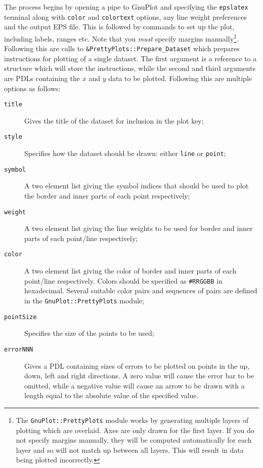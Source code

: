 The process begins by opening a pipe to {\sc GnuPlot} and specifying the {\tt epslatex} terminal along with {\tt color} and {\tt colortext} options, any line weight preferences and the output EPS file. This is followed by commands to set up the plot, including labels, ranges etc. Note that you \emph{must} specify margins manually\footnote{The {\tt GnuPlot::PrettyPlots} module works by generating multiple layers of plotting which are overlaid. Axes are only drawn for the first layer. If you do not specify margins manually, they will be computed automatically for each layer and so will not match up between all layers. This will result in data being plotted incorrectly.}. Following this are calls to {\tt \&PrettyPlots::Prepare\_Dataset} which prepares instructions for plotting of a single dataset. The first argument is a reference to a structure which will store the instructions, while the second and third arguments are PDLs containing the $x$ and $y$ data to be plotted. Following this are multiple options as follows:
\begin{description}
\item[{\tt title}] Gives the title of the dataset for inclusion in the plot key;
\item[{\tt style}] Specifies how the dataset should be drawn: either {\tt line} or {\tt point};
\item[{\tt symbol}] A two element list giving the symbol indices that should be used to plot the border and inner parts of each point respectively;
\item[{\tt weight}] A two element list giving the line weights to be used for border and inner parts of each point/line respectively;
\item[{\tt color}] A two element list giving the color of border and inner parts of each point/line respectively. Colors should be specified as {\tt \#RRGGBB} in hexadecimal. Several suitable color pairs and sequences of pairs are defined in the {\tt GnuPlot::PrettyPlots} module;
\item[{\tt pointSize}] Specifies the size of the points to be used;
\item[{\tt errorNNN}] Gives a PDL containing sizes of errors to be plotted on points in the up, down, left and right directions. A zero value will cause the error bar to be omitted, while a negative value will cause an arrow to be drawn with a length equal to the absolute value of the specified value.
\end{description}
